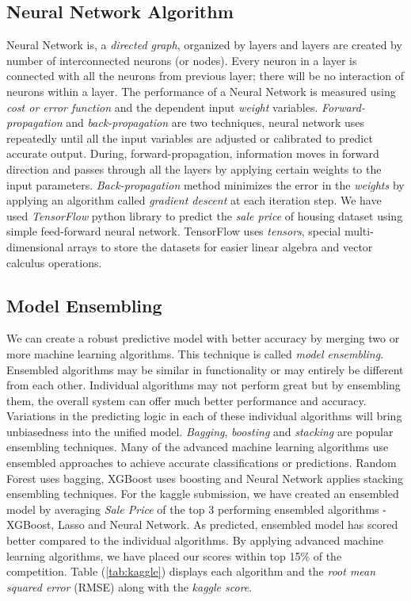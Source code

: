 \documentclass[sigconf]{acmart}
\begin{document}
	\subsection{Neural Network Algorithm}
	Neural Network is, a {\em directed graph}, organized by layers and layers are created by number of interconnected neurons (or nodes). Every neuron in a layer is connected with all the neurons from previous layer; there will be no interaction of neurons within a layer. The performance of a Neural Network is measured using {\em cost or error function} and the dependent input {\em weight} variables. {\em Forward-propagation} and {\em back-propagation} are two techniques, neural network uses repeatedly until all the input variables are adjusted or calibrated to predict accurate output. During, forward-propagation, information moves in forward direction and passes through all the layers by applying certain weights to the input parameters. {\em Back-propagation} method minimizes the error in the {\em weights} by applying an algorithm called {\em gradient descent} at each iteration step. We have used {\em TensorFlow} python library to predict the {\em sale price} of housing dataset using simple feed-forward neural network. TensorFlow uses {\em tensors}, special multi-dimensional arrays to store the datasets for easier linear algebra and vector calculus operations.
			
	\subsection{Model Ensembling}
	We can create a robust predictive model with better accuracy by merging two or more machine learning algorithms. This technique is called {\em model ensembling}. Ensembled algorithms may be similar in functionality or may entirely be different from each other. Individual algorithms may not perform great but by ensembling them, the overall system can offer much better performance and accuracy. Variations in the predicting logic in each of these individual algorithms will bring unbiasedness into the unified model. {\em Bagging}, {\em boosting} and {\em stacking} are popular ensembling techniques. Many of the advanced machine learning algorithms use ensembled approaches to achieve accurate classifications or predictions. Random Forest uses bagging, XGBoost uses boosting and Neural Network applies stacking ensembling techniques. For the kaggle submission, we have created an ensembled model by averaging {\em Sale Price} of the top 3 performing ensembled algorithms - XGBoost, Lasso and Neural Network. As predicted, ensembled model has scored better compared to the individual algorithms. By applying advanced machine learning algorithms, we have placed our scores within top 15\% of the competition. Table (\ref{tab:kaggle}) displays each algorithm and the {\em root mean squared error} (RMSE) along with the {\em kaggle score}.
					
\end{document}
